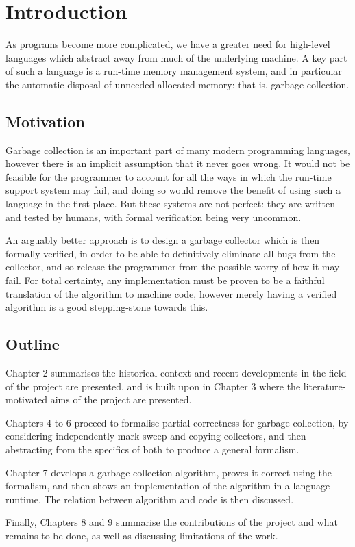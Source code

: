 \chapter{Introduction}

As programs become more complicated, we have a greater need for
high-level languages which abstract away from much of the underlying
machine. A key part of such a language is a run-time \gls{memory
  management} system, and in particular the automatic disposal of
unneeded allocated memory: that is, \gls{garbage collection}.

\section{Motivation}

Garbage collection is an important part of many modern programming
languages, however there is an implicit assumption that it never goes
wrong. It would not be feasible for the programmer to account for all
the ways in which the run-time support system may fail, and doing so
would remove the benefit of using such a language in the first
place. But these systems are not perfect: they are written and tested
by humans, with formal verification being very uncommon.

An arguably better approach is to design a \gls{garbage collector}
which is then formally verified, in order to be able to definitively
eliminate all bugs from the \gls{collector}, and so release the
programmer from the possible worry of how it may fail. For total
certainty, any implementation must be proven to be a faithful
translation of the algorithm to machine code, however merely having a
verified algorithm is a good stepping-stone towards this.

\section{Outline}

Chapter 2 summarises the historical context and recent developments in
the field of the project are presented, and is built upon in Chapter 3
where the literature-motivated aims of the project are presented.

Chapters 4 to 6 proceed to formalise partial correctness for
garbage collection, by considering independently mark-sweep and
copying collectors, and then abstracting from the specifics of both to
produce a general formalism.

Chapter 7 develops a garbage collection algorithm, proves it
correct using the formalism, and then shows an implementation of the
algorithm in a language runtime. The relation between algorithm and
code is then discussed.

Finally, Chapters 8 and 9 summarise the contributions of the project
and what remains to be done, as well as discussing limitations of the
work.
